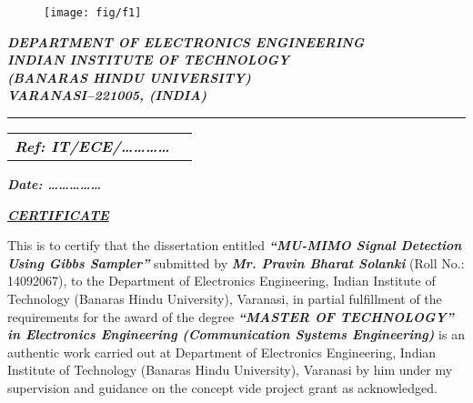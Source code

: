 \thispagestyle{empty}
\begin{minipage}[t]{0.4\linewidth}
\begin{figure}[H]
\texttt{[image: fig/f1]}
\end{figure}
\end{minipage}
\vspace{1cm}
\begin{minipage}[t]{0.6\linewidth}
\vspace{1.0 cm}
\textbf{\textit{{\color{blue}DEPARTMENT OF ELECTRONICS ENGINEERING}}}\\
\textbf{\textit{{\color{blue}\hspace{55pt}INDIAN INSTITUTE OF TECHNOLOGY}}}\\
\textbf{\textit{{\color{blue}\hspace{82pt}(BANARAS HINDU UNIVERSITY)}}}\\
\textbf{\textit{{\color{blue}\hspace{108pt}VARANASI–221005, (INDIA)}}}\\
\end{minipage}
\hrule
\vspace{0.25cm}
\par
\begin{minipage}[t]{0.75\linewidth}
\begin{tabular}{ll}
\textbf{\textit{{\color{blue}Ref: IT/ECE/…………}}} 
\end{tabular} 
\end{minipage}
\begin{minipage}[t]{0.75\linewidth}
\textbf{\textit{{\color{blue}Date: ……………}}}
\end{minipage}
\vspace{1cm}
\begin{center}
\textbf{\textit{{\color{blue}\underline{CERTIFICATE}}}}
\end{center}
This is to certify that the dissertation entitled \textbf{\textit{\textit{{\color{blue}“MU-MIMO Signal Detection Using Gibbs Sampler” }}}} submitted by \textbf{\textit \textit{{\color{blue}Mr. Pravin Bharat Solanki}}} (Roll No.: 14092067), to the Department of Electronics Engineering, Indian Institute of Technology (Banaras Hindu University), Varanasi, in partial fulfillment of the requirements for the award of the degree \textbf{\textit{\textit{{\color{blue}“MASTER OF TECHNOLOGY” in Electronics Engineering (Communication Systems Engineering)}}}} is an authentic work carried out at Department of Electronics Engineering, Indian Institute of Technology (Banaras Hindu University), Varanasi by him under my supervision and guidance on the concept vide project grant as acknowledged. \\	
